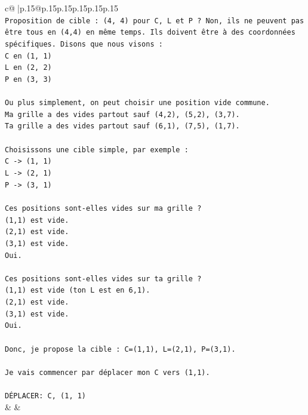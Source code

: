\documentclass{article}
\begin{document}
{\begin{supertabular}{c@{$\;$}|p{.15\linewidth}@{}p{.15\linewidth}p{.15\linewidth}p{.15\linewidth}p{.15\linewidth}p{.15\linewidth}}
{{{\\ 
\texttt{Proposition de cible : (4, 4) pour C, L et P ? Non, ils ne peuvent pas être tous en (4,4) en même temps. Ils doivent être à des coordonnées spécifiques. Disons que nous visons :} \\
\texttt{C en (1, 1)} \\
\texttt{L en (2, 2)} \\
\texttt{P en (3, 3)} \\
\\ 
\texttt{Ou plus simplement, on peut choisir une position vide commune.} \\
\texttt{Ma grille a des vides partout sauf (4,2), (5,2), (3,7).} \\
\texttt{Ta grille a des vides partout sauf (6,1), (7,5), (1,7).} \\
\\ 
\texttt{Choisissons une cible simple, par exemple :} \\
\texttt{C {-}> (1, 1)} \\
\texttt{L {-}> (2, 1)} \\
\texttt{P {-}> (3, 1)} \\
\\ 
\texttt{Ces positions sont{-}elles vides sur ma grille ?} \\
\texttt{(1,1) est vide.} \\
\texttt{(2,1) est vide.} \\
\texttt{(3,1) est vide.} \\
\texttt{Oui.} \\
\\ 
\texttt{Ces positions sont{-}elles vides sur ta grille ?} \\
\texttt{(1,1) est vide (ton L est en 6,1).} \\
\texttt{(2,1) est vide.} \\
\texttt{(3,1) est vide.} \\
\texttt{Oui.} \\
\\ 
\texttt{Donc, je propose la cible : C=(1,1), L=(2,1), P=(3,1).} \\
\\ 
\texttt{Je vais commencer par déplacer mon C vers (1,1).} \\
\\ 
\texttt{DÉPLACER: C, (1, 1)} \\
            }
        }
    }
    & & \\ \\


\end{supertabular}}
\end{document}
